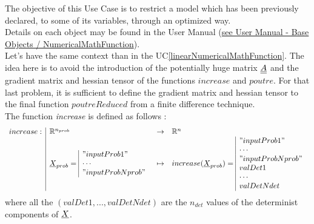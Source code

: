 \renewcommand{\filename}{docUC_LSF_DeterministicVar2.tex}
\renewcommand{\filetitle}{UC : Introducing some deterministic variables, optimizing memory and CPU time}

\HeaderIIILevel




The objective of this Use Case is to restrict a model which has been previously declared, to some of its variables, through an optimized way.\\

Details on each object may be found in the User Manual  (\href{OpenTURNS_UserManual_TUI.pdf}{see User Manual - Base Objects / NumericalMathFunction}).\\

Let's have the same context than in the UC\ref{linearNumericalMathFunction}. The idea here is to avoid the introduction of the potentially huge matrix ${\underline{\underline{A}}}$ and the gradient matrix and hessian tensor  of the functions $increase$ and $poutre$. For that last problem, it is sufficient to define the gradient matrix and hessian tensor to the final function $poutreReduced$ from a finite difference technique.\\

The function {\itshape increase} is defined as follows :
$$
\begin{array}{l|lcl}
  increase : & \mathbb{R}^{n_{prob}}  & \rightarrow & \mathbb{R}^n \\
  &  {\underline{X}}_{prob} =
  \begin{array}{|l}
    "inputProb1" \\
    \cdots       \\
    "inputProbNprob"
  \end{array}
  & \mapsto     & increase({\underline{X}}_{prob}) =
  \begin{array}{|l}
    "inputProb1" \\
    \cdots       \\
    "inputProbNprob" \\
    valDet1 \\
    \cdots       \\
    valDetNdet
  \end{array}
\end{array}
$$
where all the $(valDet1, ..., valDetNdet)$ are the $n_{det}$ values of the determinist components of ${\underline{X}}$.\\

